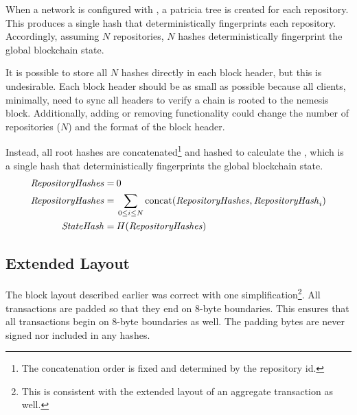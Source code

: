 When a network is configured with , a patricia tree is created for each repository.
This produces a single hash that deterministically fingerprints each repository.
Accordingly, assuming $N$ repositories, $N$ hashes deterministically fingerprint the global blockchain state.

It is possible to store all $N$ hashes directly in each block header, but this is undesirable.
Each block header should be as small as possible because all clients, minimally, need to sync all headers to verify a chain is rooted to the nemesis block.
Additionally, adding or removing functionality could change the number of repositories ($N$) and the format of the block header.

Instead, all root hashes are concatenated\footnote{The concatenation order is fixed and determined by the repository id.} and hashed to calculate the ,
which is a single hash that deterministically fingerprints the global blockchain state.
\begin{align*}
\mathit{RepositoryHashes} = \: & 0 \\
\mathit{RepositoryHashes} = \: & \sum_{0\leq i \leq N} \mathrm{concat}(\mathit{RepositoryHashes}, \mathit{RepositoryHash}_i) \\
\mathit{StateHash} = \: & H(\mathit{RepositoryHashes})
\end{align*}

\subsection{Extended Layout}

The block layout described earlier was correct with one simplification\footnote{
This is consistent with the extended layout of an aggregate transaction as well.}.
All transactions are padded so that they end on 8-byte boundaries.
This ensures that all transactions begin on 8-byte boundaries as well.
The padding bytes are never signed nor included in any hashes.

\begin{figure}[H]
\end{figure}
